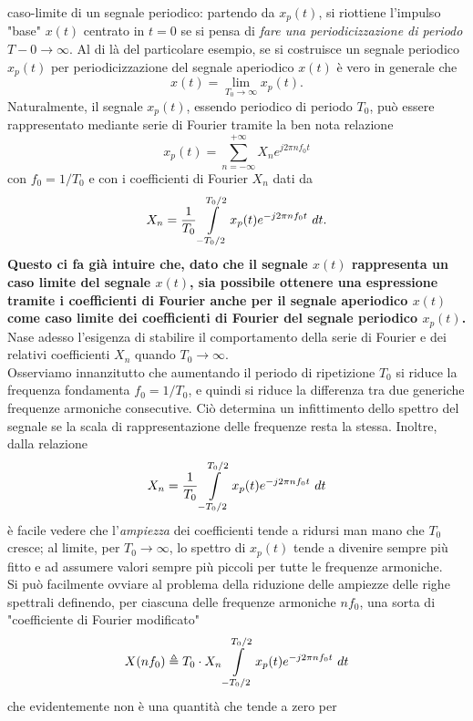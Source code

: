\documentclass[12pt,oneside,openany]{memoir}
\numberwithin{equation}{subsection}
\newcommand{\dt}{\ dt}
\begin{document}
caso-limite di un segnale periodico: partendo da $x_p(t)$, si riottiene
l'impulso "base" $x(t)$ centrato in $t = 0$ se si pensa di \textit{fare una
periodicizzazione di periodo $T-0 \rightarrow \infty$}. Al di l\`a del
particolare esempio, se si costruisce un segnale periodico $x_p(t)$ per
periodicizzazione del segnale aperiodico $x(t)$ \`e vero in generale che
\begin{equation}
	x(t) = \lim_{T_0 \rightarrow \infty} x_p(t).
\end{equation}
Naturalmente, il segnale $x_p(t)$, essendo periodico di periodo $T_0$, pu\`o
essere rappresentato mediante serie di Fourier tramite la ben nota relazione
\[
	x_p(t) = \sum_{n = -\infty}^{+\infty} X_n e^{j 2 \pi n f_0 t}
\]
con $f_0 = 1/T_0$ e con i coefficienti di Fourier $X_n$ dati da
\[
	X_n = \frac{1}{T_0} \int\displaylimits_{-T_0/2}^{T_0/2} x_p(t)
	e^{-j 2 \pi n f_0 t} \dt.
\]
\textbf{Questo ci fa gi\`a intuire che, dato che il segnale $x(t)$ rappresenta
un caso limite del segnale $x(t)$, sia possibile ottenere una espressione
tramite i coefficienti di Fourier anche per il segnale aperiodico $x(t)$ come
caso limite dei coefficienti di Fourier del segnale periodico $x_p(t)$.}
\bigbreak
Nase adesso l'esigenza di stabilire il comportamento della serie di Fourier e
dei relativi coefficienti $X_n$ quando $T_0 \rightarrow \infty$.\\
Osserviamo innanzitutto che aumentando il periodo di ripetizione $T_0$ si riduce
la frequenza fondamenta $f_ 0 = 1/T_0$, e quindi si riduce la differenza tra due
generiche frequenze armoniche consecutive. Ci\`o determina un infittimento dello
spettro del segnale se la scala di rappresentazione delle frequenze resta la
stessa. Inoltre, dalla relazione 
\[
	X_n = \frac{1}{T_0} \int\displaylimits_{-T_0/2}^{T_0/2} x_p(t)
	e^{-j 2 \pi n f_0 t} \dt
\]
\`e facile vedere che l'\textit{ampiezza} dei coefficienti tende a ridursi man
mano che $T_0$ cresce; al limite, per $T_0 \rightarrow \infty$, lo spettro di
$x_p(t)$ tende a divenire sempre pi\`u fitto e ad assumere valori sempre pi\`u
piccoli per tutte le frequenze armoniche.\\
Si pu\`o facilmente ovviare al problema della riduzione delle ampiezze delle
righe spettrali definendo, per ciascuna delle frequenze armoniche $nf_0$, una
sorta di "coefficiente di Fourier modificato"
\begin{equation}
	X(nf_0) \triangleq T_0 \cdot X_n \int\displaylimits_{-T_0/2}^{T_0/2}
	x_p(t) e^{-j 2 \pi n f_0 t} \dt
\end{equation}
che evidentemente non \`e una quantit\`a che tende a zero per
\end{document}
